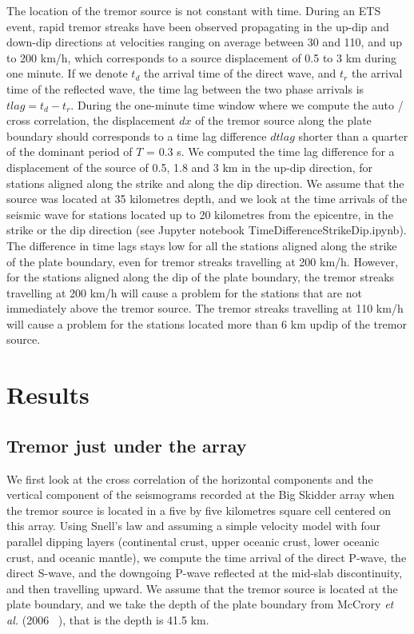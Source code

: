 \documentclass[main.tex]{subfiles}
\begin{document}
The location of the tremor source is not constant with time. During an ETS event, rapid tremor streaks have been observed propagating in the up-dip and down-dip directions at velocities ranging on average between 30 and 110, and up to 200 km/h, which corresponds to a source displacement of 0.5 to 3 km during one minute. If we denote $t_d$ the arrival time of the direct wave, and $t_r$ the arrival time of the reflected wave, the time lag between the two phase arrivals is $tlag = t_d - t_r$. During the one-minute time window where we compute the auto / cross correlation, the displacement $dx$ of the tremor source along the plate boundary should corresponds to a time lag difference $dtlag$ shorter than a quarter of the dominant period of $T$ = 0.3 s. We computed the time lag difference for a displacement of the source of 0.5, 1.8 and 3 km in the up-dip direction, for stations aligned along the strike and along the dip direction. We assume that the source was located at 35 kilometres depth, and we look at the time arrivals of the seismic wave for stations located up to 20 kilometres from the epicentre, in the strike or the dip direction (see Jupyter notebook TimeDifferenceStrikeDip.ipynb). The difference in time lags stays low for all the stations aligned along the strike of the plate boundary, even for tremor streaks travelling at 200 km/h. However, for the stations aligned along the dip of the plate boundary, the tremor streaks travelling at 200 km/h will cause a problem for the stations that are not immediately above the tremor source. The tremor streaks travelling at 110 km/h will cause a problem for the stations located more than 6 km updip of the tremor source.

\chapter{Results}

\section{Tremor just under the array}

We first look at the cross correlation of the horizontal components and the vertical component of the seismograms recorded at the Big Skidder array when the tremor source is located in a five by five kilometres square cell centered on this array. Using Snell's law and assuming a simple velocity model with four parallel dipping layers (continental crust, upper oceanic crust, lower oceanic crust, and oceanic mantle), we compute the time arrival of the direct P-wave, the direct S-wave, and the downgoing P-wave reflected at the mid-slab discontinuity, and then travelling upward. We assume that the tremor source is located at the plate boundary, and we take the depth of the plate boundary from McCrory \textit{et al.} (2006 ~\cite{MCC_2006}), that is the depth is 41.5 km. \\
\end{document}

